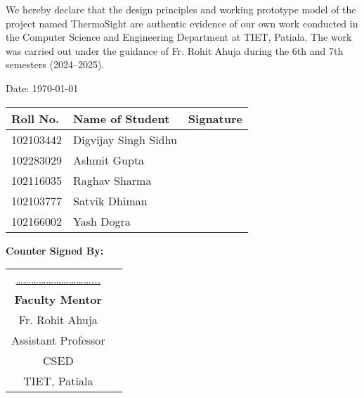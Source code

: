 \noindent We hereby declare that the design principles and working prototype model of the project named ThermoSight are authentic evidence of our own work conducted in the Computer Science and Engineering Department at TIET, Patiala. The work was carried out under the guidance of Fr. Rohit Ahuja during the 6th and 7th semesters (2024–2025).

\par \noindent Date: \today
\newline
\begin{table}[H]
    \centering
    \renewcommand{\arraystretch}{1.5}
    \begin{tabularx}{\textwidth}{|X|X|X|}
        \hline
        \textbf{Roll No.} & \textbf{Name of Student} & \textbf{Signature} \\
        \hline
        102103442         & Digvijay Singh Sidhu     &                    \\
        \hline
        102283029         & Ashmit Gupta             &                    \\
        \hline
        102116035         & Raghav Sharma            &                    \\
        \hline
        102103777         & Satvik Dhiman            &                    \\
        \hline
        102166002         & Yash Dogra               &                    \\
        \hline
    \end{tabularx}
\end{table}

\noindent
\textbf{Counter Signed By:}

\vspace{1.5cm}
\begin{table}[H]
    \centering
    \renewcommand{\arraystretch}{1}
    \begin{tabularx}{\textwidth}{cc}
        \underline{…………………………...} & \\
        \textbf{Faculty Mentor}       & \\
        Fr. Rohit Ahuja                & \\
        Assistant Professor           & \\
        CSED                           & \\
        TIET, Patiala                  & \\
    \end{tabularx}
\end{table}
